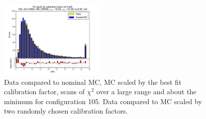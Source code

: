 \begin{figure}[htbp]
\begin{center}
\includegraphics[width=0.45\textwidth]{../FIGURES/105/FIG_Fit_result_for_calibration_factor_of_0_465.pdf} 
\caption{Data compared to nominal MC, MC scaled by the best fit calibration factor, scans of $\chi^2$ over a large range and about the minimum for configuration 105. Data compared to MC scaled by two randomly chosen calibration factors.} 
\label{tab:best_105} 
\end{center} \end{figure} 

